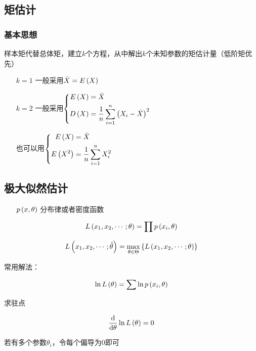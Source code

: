 \documentclass{article}
\begin{document}
\subsection{矩估计}

\subsubsection{基本思想}

样本矩代替总体矩，建立$k$个方程，从中解出$k$个未知参数的矩估计量（低阶矩优先）

\begin{enumerate}
    \item [$k=1$] 一般采用$\bar X=E\left(X\right)$
    \item [$k=2$]
          一般采用$\left\{\begin{aligned}
                  E\left(X\right) & =\bar X                          \\
                  D\left(X\right) & =\frac1n\sum_{i=1}^n{\left(X_i-\bar X\right)}^2 \\
              \end{aligned}\right.$

          也可以用$\left\{\begin{aligned}
                  E\left(X\right)   & =\bar X              \\
                  E\left(X^2\right) & =\frac1n\sum_{i=1}^n X_i^2 \\
              \end{aligned}\right.$
\end{enumerate}

\subsection{极大似然估计}

\begin{enumerate}
    \item [$p\left(x,\theta\right)$] 分布律或者密度函数
\end{enumerate}

\[L\left(x_1,x_2,\cdots;\theta\right)=\prod p\left(x_i,\theta\right)\]

\[L\left(x_1,x_2,\cdots;\hat\theta\right)=\max_{\theta\in\Theta}\left\{L\left(x_1,x_2,\cdots;\theta\right)\right\}\]

常用解法：

\[\ln L\left(\theta\right)=\sum\ln p\left(x_i,\theta\right)\]

求驻点

\[\frac{\mathrm d}{\mathrm d\theta}\ln L\left(\theta\right)=0\]

若有多个参数$\theta_i$，令每个偏导为$0$即可
\end{document}
